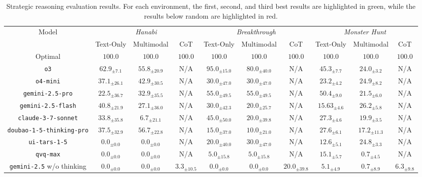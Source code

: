 \begin{table}[t]
\centering
\caption{Strategic reasoning evaluation results. For each environment, the \colorbox{first}{first}, \colorbox{second}{second}, and \colorbox{third}{third} best results are highlighted in green, while the results \colorbox{below}{below random} are highlighted in red.}
\label{tab:reasoning}
\scriptsize
\setlength{\tabcolsep}{5pt}
\centering
\begin{tabular}{cccccccccc}
\toprule
\multirow{2}{*}{Model} & \multicolumn{3}{c}{\textit{Hanabi}} & \multicolumn{3}{c}{\textit{Breakthrough}} & \multicolumn{3}{c}{\textit{Monster Hunt}} \\
& Text-Only & Multimodal & CoT & Text-Only & Multimodal & CoT& Text-Only & Multimodal & CoT \\
\midrule
Optimal & $100.0$ & $100.0$ & $100.0$ & $100.0$ & $100.0$ & $100.0$ & $100.0$ & $100.0$ & $100.0$  \\
\midrule
\texttt{o3} & $62.9_{\pm7.1}$ & $55.8_{\pm20.9}$ & N/A & $95.0_{\pm15.0}$ & $80.0_{\pm40.0}$ & N/A & $45.3_{\pm7.7}$ & $24.0_{\pm3.2}$ & N/A  \\
\texttt{o4-mini} & $37.1_{\pm26.1}$ & $42.9_{\pm30.5}$ & N/A & $30.0_{\pm47.0}$ & $30.0_{\pm47.0}$ & N/A & $23.2_{\pm4.2}$ & $24.9_{\pm8.2}$ & N/A  \\
\texttt{gemini-2.5-pro} & $22.5_{\pm36.7}$ & $32.9_{\pm35.5}$ & N/A & $55.0_{\pm49.5}$ & $55.0_{\pm49.5}$ & N/A & $50.4_{\pm9.0}$ & $21.5_{\pm6.0}$ & N/A  \\
\texttt{gemini-2.5-flash} & $40.8_{\pm21.9}$ & $27.1_{\pm36.0}$ & N/A & $30.0_{\pm42.3}$ & $20.0_{\pm25.7}$ & N/A & $15.63_{\pm4.6}$ & $26.2_{\pm5.8}$ & N/A\\
\texttt{claude-3-7-sonnet} & $33.8_{\pm35.8}$ & $6.7_{\pm21.1}$ & N/A & $45.0_{\pm50.0}$ & $20.0_{\pm39.8}$ & N/A & $27.3_{\pm4.6}$ & $19.9_{\pm3.5}$ & N/A  \\
\texttt{doubao-1-5-thinking-pro} & $37.5_{\pm32.9}$ & $56.7_{\pm22.8}$ & N/A & $15.0_{\pm37.0}$ & $10.0_{\pm21.0}$ & N/A & $27.6_{\pm6.1}$ & $17.2_{\pm11.3}$ & N/A  \\
\texttt{ui-tars-1-5} & $0.0_{\pm0.0}$ & $0.0_{\pm0.0}$ & N/A & $20.0_{\pm40.0}$ & $30.0_{\pm47.0}$ & N/A & $12.6_{\pm5.1}$ & $24.8_{\pm3.3}$ & N/A \\
\texttt{qvq-max} & $0.0_{\pm0.0}$ & $0.0_{\pm0.0}$ & N/A & $5.0_{\pm15.8}$ & $5.0_{\pm15.8}$ & N/A & $15.1_{\pm5.7}$ & $0.7_{\pm4.5}$ & N/A \\
\midrule
\texttt{gemini-2.5} w/o thinking & $0.0_{\pm0.0}$ & $0.0_{\pm0.0}$ & $3.3_{\pm10.5}$ & $0.0_{\pm0.0}$ & $0.0_{\pm0.0}$ & $20.0_{\pm39.8}$ & $5.1_{\pm4.9}$ & $0.7_{\pm8.9}$ & $6.3_{\pm9.8}$  \\

\end{tabular}
\end{table}
